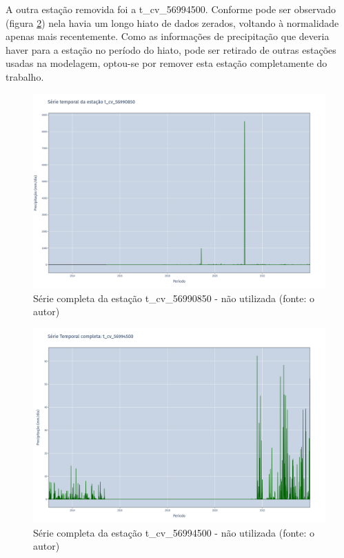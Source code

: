 A outra estação removida foi a t\_cv\_56994500. Conforme pode ser observado (figura \ref{fig:rioDoceSerie_t_cv_56994500_completa}) nela havia um longo hiato de dados zerados, voltando à normalidade apenas mais recentemente. Como as informações de precipitação que deveria haver para a estação no período do hiato, pode ser retirado de outras estações usadas na modelagem, optou-se por remover esta estação completamente do trabalho.

\begin{figure}[!h]
\centering
\includegraphics[scale=0.25]{Figuras/rio_doce/rioDoceSerie_t_cv_56990850_completa.png}
\caption{Série completa da estação t\_cv\_56990850 - não utilizada (fonte: o autor)}
\label{fig:rioDoceSerie_t_cv_56990850_completa}
\end{figure}

\begin{figure}[!h]
\centering
\includegraphics[scale=0.25]{Figuras/rio_doce/rioDoceSerie_t_cv_56994500_completa.png}
\caption{Série completa da estação t\_cv\_56994500 - não utilizada (fonte: o autor)}
\label{fig:rioDoceSerie_t_cv_56994500_completa}
\end{figure}

